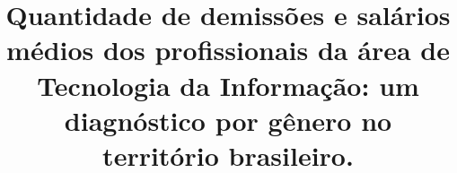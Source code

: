 \title{Quantidade de demissões e salários médios dos profissionais da área de Tecnologia da Informação: um diagnóstico por gênero no território brasileiro.  \\
}